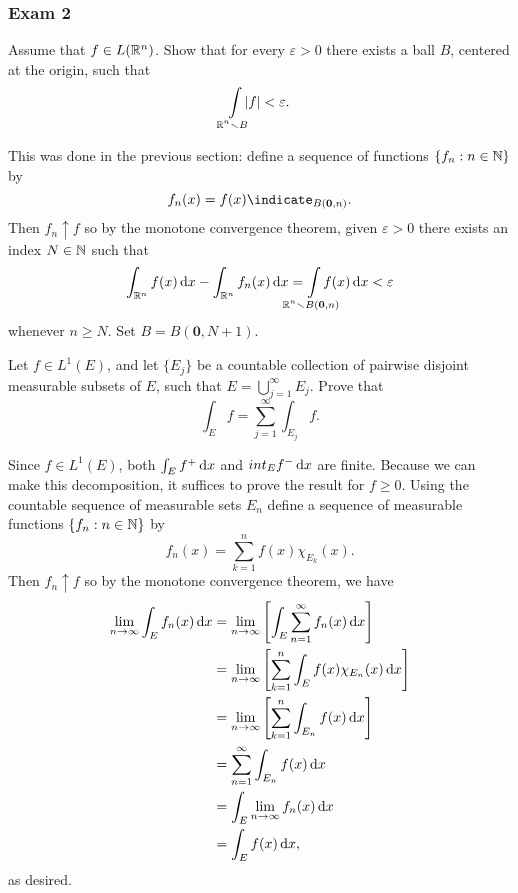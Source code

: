 \subsubsection{Exam 2}
\setcounter{exercise}{0}
\setcounter{equation}{0}

\begin{problem}
  Assume that \(f\in L(\mathbb{R}^n)\). Show that for every \(\varepsilon>0\)
  there exists a ball \(B\), centered at the origin, such that
  \[
    \int\limsclap{\bbR^n\setminus B}|f|<\varepsilon.
  \]
\end{problem}
\begin{solution}
  This was done in the previous section: define a sequence of functions
  \(\{f_n:n\in\mathbb{N}\}\) by
  \[
    f_n(x)=f(x)\indicate_{B(\mathbf{0},n)}.
  \]
  Then \(f_n\uparrow f\) so by the monotone convergence theorem, given
  \(\varepsilon>0\) there exists an index \(N\in\mathbb{N}\) such that
  \[
    \int_{\bbR^n}f(x)\diff x-\int_{\bbR^n}f_n(x)\diff
    x=\int\limsclap{\bbR^n\setminus B(\mathbf{0},n)} f(x)\diff x<\varepsilon
  \]
  whenever \(n\geq N\). Set \(B=B(\mathbf{0},N+1)\).
\end{solution}

\begin{problem}
  Let \(f\in L^1(E)\), and let \(\{E_j\}\) be a countable collection of
  pairwise disjoint measurable subsets of \(E\), such that
  \(E=\bigcup_{j=1}^\infty E_j\). Prove that
  \[
    \int_E f=\sum_{j=1}^\infty\int_{E_j}f.
  \]
\end{problem}
\begin{solution}
  Since \(f\in L^1(E)\), both \(\int_E f^+\mathop{}\!\mathrm{d} x\) and
  \(int_E f^-\mathop{}\!\mathrm{d} x\) are finite. Because we can make this decomposition,
  it suffices to prove the result for \(f\geq 0\). Using the countable
  sequence of measurable sets \(E_n\) define a sequence of measurable
  functions \(\{f_n:n\in\mathbb{N}\}\) by
  \[
    f_n(x)=\sum_{k=1}^n f(x)\chi_{E_k}(x).
  \]
  Then \(f_n\uparrow f\) so by the monotone convergence theorem, we have
  \begin{align*}
    \lim_{n\to\infty}\int_E f_n(x)\mathop{}\!\mathrm{d} x
    &=\lim_{n\to\infty}\left[\int_E\sum_{n=1}^\infty f_n(x)\mathop{}\!\mathrm{d} x\right]\\
    &=\lim_{n\to\infty}\left[\sum_{k=1}^n\int_E f(x)\chi_{E_n}(x)\mathop{}\!\mathrm{d} x\right]\\
    &=\lim_{n\to\infty}\left[\sum_{k=1}^n\int_{E_n} f(x)\mathop{}\!\mathrm{d} x\right]\\
    &=\sum_{n=1}^\infty\int_{E_n}f(x)\mathop{}\!\mathrm{d} x\\
    &=\int_E \lim_{n\to\infty}f_n(x)\mathop{}\!\mathrm{d} x\\
    &=\int_E f(x)\mathop{}\!\mathrm{d} x,
  \end{align*}
  as desired.
\end{solution}

